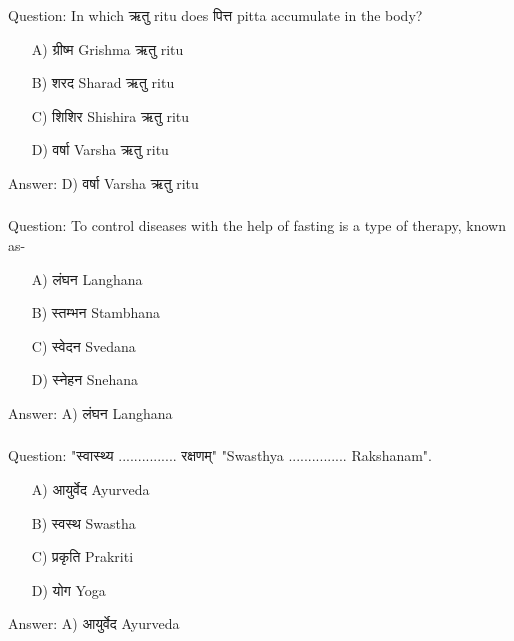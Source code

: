 \begin{frame}[fragile]\frametitle{}

Question: In which ऋतु ritu does पित्त pitta accumulate in the body?

\begin{itemize}
\item[A)] ग्रीष्म Grishma ऋतु ritu
\item[B)] शरद Sharad ऋतु ritu
\item[C)] शिशिर Shishira ऋतु ritu
\item[D)] वर्षा Varsha ऋतु ritu
\end{itemize}

Answer: D) वर्षा Varsha ऋतु ritu
\end{frame}

\begin{frame}[fragile]\frametitle{}

Question: To control diseases with the help of fasting is a type of therapy, known as-

\begin{itemize}
\item[A)] लंघन Langhana
\item[B)] स्तम्भन Stambhana
\item[C)] स्वेदन Svedana
\item[D)] स्नेहन Snehana
\end{itemize}

Answer: A) लंघन Langhana
\end{frame}

\begin{frame}[fragile]\frametitle{}

Question: "स्वास्थ्य ............... रक्षणम्" "Swasthya ............... Rakshanam".

\begin{itemize}
\item[A)] आयुर्वेद Ayurveda
\item[B)] स्वस्थ Swastha
\item[C)] प्रकृति Prakriti
\item[D)] योग Yoga
\end{itemize}

Answer: A) आयुर्वेद Ayurveda
\end{frame}

